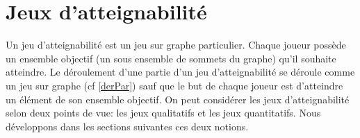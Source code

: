 
\section{Jeux d'atteignabilité}
\label{sect:jeuxAtt}

Un jeu d'atteignabilité est un jeu sur graphe particulier. Chaque joueur possède un ensemble objectif (un sous ensemble de sommets du graphe) qu'il souhaite atteindre. Le déroulement d'une partie d'un jeu d'atteignabilité se déroule comme un jeu sur graphe (cf \ref{derPar}) sauf que le but de chaque joueur est d'atteindre un élément de son ensemble objectif. On peut considérer les jeux d'atteignabilité selon deux points de vue: les jeux qualitatifs et les jeux quantitatifs. Nous développons dans les sections suivantes ces deux notions.







